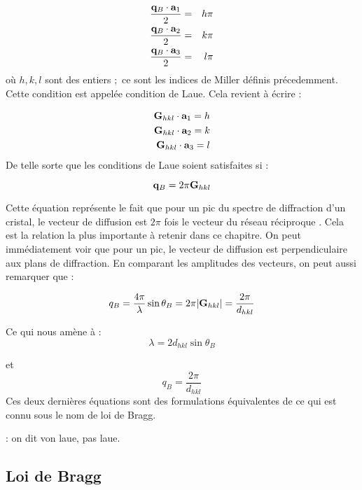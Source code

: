 \begin{eqnarray}
    \frac{\mathbf{q}_B \cdot \mathbf{a}_1}{2} & = & h \pi \\
    \frac{\mathbf{q}_B \cdot \mathbf{a}_2}{2} & = & k \pi \\
    \frac{\mathbf{q}_B \cdot \mathbf{a}_3}{2} & = & l \pi
\end{eqnarray}
où $h,k,l$ sont des entiers ; ce sont les indices de Miller définis précedemment.
Cette condition est appelée condition de Laue. Cela revient à écrire :

\begin{eqnarray}
    \mathbf{G}_{hkl} \cdot \mathbf{a}_1 = h \\
    \mathbf{G}_{hkl} \cdot \mathbf{a}_2 = k \\
    \mathbf{G}_{hkl} \cdot \mathbf{a}_3 = l
\end{eqnarray}
De telle sorte que les conditions de Laue soient satisfaites si :

\begin{equation}
    \mathbf{q}_B = 2\pi \mathbf{G}_{hkl}
\end{equation}

Cette équation représente le fait que pour un pic du spectre de diffraction d'un
cristal, le vecteur de diffusion est $2 \pi$ fois le vecteur du réseau réciproque
. Cela est la relation la plus importante à retenir dans ce chapitre. On peut
immédiatement voir que pour un pic, le vecteur de diffusion est perpendiculaire
aux plans de diffraction. En comparant les amplitudes des vecteurs, on peut aussi
remarquer que :

\begin{equation}
    q_B = \frac{4\pi}{\lambda} \sin \theta_B = 2\pi |\mathbf{G}_{hkl} | = \frac{2\pi}{d_{hkl}}
\end{equation}

Ce qui nous amène à :
\begin{equation}
    \lambda = 2 d_{hkl} \sin \theta_B
\end{equation}

et
\begin{equation}
    q_B = \frac{2\pi}{d_{hkl}}
\end{equation}
Ces deux dernières équations sont des formulations équivalentes de ce qui est
connu sous le nom de loi de Bragg.

\TODO: on dit von laue, pas laue.

\subsection{Loi de Bragg}

